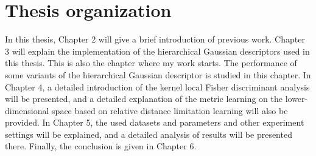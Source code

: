 \section{Thesis organization}
In this thesis, Chapter 2 will give a brief introduction of previous work. Chapter 3 will explain the implementation of the hierarchical Gaussian descriptors used in this thesis. This is also the chapter where my work starts. The performance of some variants of the hierarchical Gaussian descriptor is studied in this chapter. In Chapter 4, a detailed introduction of the kernel local Fisher discriminant analysis will be presented, and a detailed explanation of the metric learning on the lower-dimensional space based on relative distance limitation learning will also be provided.
In Chapter 5, the used datasets and parameters and other experiment settings will be explained, and a detailed analysis of results will be presented there. Finally, the conclusion is given in Chapter 6.




